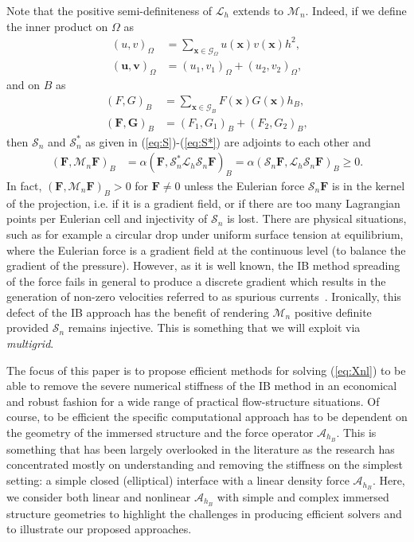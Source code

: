 \documentclass[preprint,12pt]{elsarticle}
\begin{document}
Note that  the positive semi-definiteness of $\mathcal{L}_h$ extends to $\mathcal{M}_n$. Indeed, if we define the inner product on $\Omega$ as
\begin{align}
(u,v)_{\Omega} &= \sum_{\mathbf{x} \in \mathcal{G}_\Omega} u(\mathbf{x})v(\mathbf{x})h^2,\label{eq:innero} \\
(\mathbf{u},\mathbf{v})_{\Omega} &=  (u_1,v_1)_{\Omega} + (u_2,v_2)_{\Omega},
\end{align}
and on $B$ as
\begin{align}
(F,G)_{B} &= \sum_{\mathbf{x} \in \mathcal{G}_B} F(\mathbf{x})G(\mathbf{x})h_B,\label{eq:innerb} \\
(\mathbf{F},\mathbf{G})_{B} &= (F_1,G_1)_{B} + (F_2,G_2)_{B},
\end{align}
then  $\mathcal{S}_n$ and $\mathcal{S}_n^*$ as given in (\ref{eq:S})-(\ref{eq:S*}) are adjoints to each other 
and
\begin{align}
( \mathbf{F}, \mathcal{M}_n\mathbf{F} )_{B} &= \alpha ( \mathbf{F},\mathcal{S}^*_n\mathcal{L}_h\mathcal{S}_n \mathbf{F})_{B} =\alpha ( \mathcal{S}_n\mathbf{F}, \mathcal{L}_h\mathcal{S}_n\mathbf{F})_{B}\geq 0.
\end{align}
In fact, $( \mathbf{F}, \mathcal{M}_n\mathbf{F} )_{B}>0$ for $\mathbf{F} \neq 0$ unless the Eulerian force $\mathcal{S}_n \mathbf{F}$ is in the kernel of the projection, i.e. if it is a gradient field,  or if there are too many Lagrangian points per Eulerian cell and injectivity of $\mathcal{S}_n$ is lost. There are physical situations, such as for example a circular drop under uniform surface tension at equilibrium, where the Eulerian force is a gradient field at the continuous level (to balance the gradient of the pressure). However, as it is well 
known, the IB method spreading of the force fails in general to produce a discrete gradient which results in the generation of non-zero velocities referred to as spurious currents~\cite{Tryg01}.  Ironically, this defect of the IB approach has the benefit of rendering  $ \mathcal{M}_n$ positive definite provided $\mathcal{S}_n$ remains injective. This is something that we will exploit via {\em multigrid}.


The focus of this paper is to propose efficient methods for solving (\ref{eq:Xnl}) to be able to remove the severe numerical stiffness of the IB method in an economical and robust fashion for a wide range of practical flow-structure situations.  Of course, to be efficient the specific computational approach  has to be dependent on the geometry of the immersed structure and the force operator $\mathcal{A}_{h_B}$.  This is something that has been largely 
overlooked in the literature as the research has concentrated mostly on understanding  and removing the stiffness 
on the simplest setting: a simple closed (elliptical) interface with a linear density force $\mathcal{A}_{h_B}$.
Here, we consider both linear and nonlinear $\mathcal{A}_{h_B}$ with simple and complex immersed structure geometries to highlight the challenges in producing efficient solvers and to illustrate our proposed approaches.
\end{document}
